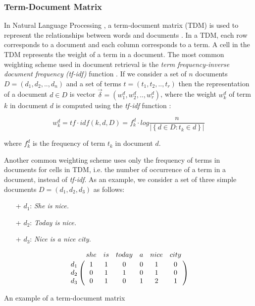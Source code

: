 \subsubsection{Term-Document Matrix}
 In Natural Language Processing \cite{Collobert:2011:NLP:1953048.2078186}, a term-document matrix (TDM) is used to represent the relationships between words and documents \cite{Turney:2010:FMV:1861751.1861756}. In a TDM, each row corresponds to a document and each column corresponds to a term. A cell in the TDM represents the weight of a term in a document. The most common weighting scheme used in document retrieval is the \emph{term frequency-inverse document frequency (tf-idf)} function \cite{Reed:2006:TNT:1193211.1193734}. If we consider a set of $n$ documents $D=(d_{1},d_{2},..,d_{n})$ and a set of terms $t=(t_{1},t_{2},..,t_{r})$ then the representation of a document $d \in D $ is vector $\vec{\delta}=(w_{1}^{d},w_{2}^{d},..,w_{r}^{d})$, where the weight $w_{k}^{d}$ of term $k$ in document $d$ is computed using the {\em tf-idf} function \cite{Ramos1999}:

\begin{equation} \label{tfidf} %
w_{k}^{d} =tf\cdot idf(k,d,D)= f_{k}^{d}\cdot log\frac{n}{\left | \left \{ d\in D: t_{k} \in d \right \} \right |} 
\end{equation}

where $f_{k}^{d}$ is the frequency of term $t_{k}$ in document $d$.

Another common weighting scheme uses only the frequency of terms in documents for cells in TDM, i.e. the number of occurrence of a term in a document, instead of {\em tf-idf}. As an example, we consider a set of three simple documents $D=(d_{1},d_{2},d_{3})$ as follows:

\begin{itemize}
	\item[+] $d_{1}$: \emph{She is nice.}
	\item[+] $d_{2}$: \emph{Today is nice.}
	\item[+] $d_{3}$: \emph{Nice is a nice city.}
\end{itemize}

\begin{table}[h!]
	\begin{equation} \nonumber
	\bordermatrix{~ & she & is & today & a & nice & city \cr	
		d_{1} 		& 1 & 1 & 0 & 0 & 1 & 0 \cr 
		d_{2} 		& 0 & 1 & 1 & 0 & 1 & 0 \cr  
		d_{3} 		& 0 & 1 & 0 & 1 & 2 & 1 \cr }
	\end{equation}
	\caption{An example of a term-document matrix}
	\label{fig:TDM}
\end{table}

